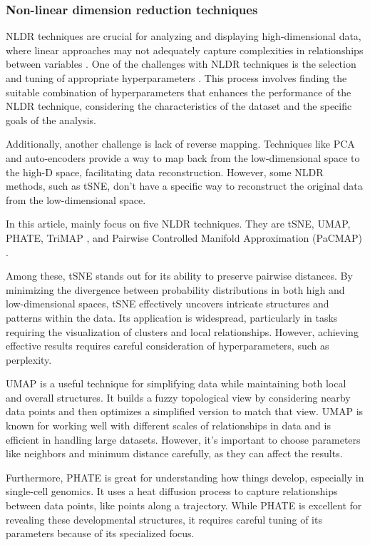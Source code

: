 \documentclass[
  12pt]{article}
\begin{document}
\subsubsection{Non-linear dimension reduction
techniques}\label{non-linear-dimension-reduction-techniques}

NLDR techniques are crucial for analyzing and displaying
high-dimensional data, where linear approaches may not adequately
capture complexities in relationships between variables
\citep{Johnstone2009}. One of the challenges with NLDR techniques is the
selection and tuning of appropriate hyperparameters \citep{liao2023}.
This process involves finding the suitable combination of
hyperparameters that enhances the performance of the NLDR technique,
considering the characteristics of the dataset and the specific goals of
the analysis.

Additionally, another challenge is lack of reverse mapping. Techniques
like PCA and auto-encoders \citep{article65} provide a way to map back
from the low-dimensional space to the high-D space, facilitating data
reconstruction. However, some NLDR methods, such as tSNE, don't have a
specific way to reconstruct the original data from the low-dimensional
space.

In this article, mainly focus on five NLDR techniques. They are tSNE,
UMAP, PHATE, TriMAP \citep{article02}, and Pairwise Controlled Manifold
Approximation (PaCMAP) \citep{Yingfan2021}.

Among these, tSNE \citep{Laurens2008} stands out for its ability to
preserve pairwise distances. By minimizing the divergence between
probability distributions in both high and low-dimensional spaces, tSNE
effectively uncovers intricate structures and patterns within the data.
Its application is widespread, particularly in tasks requiring the
visualization of clusters and local relationships. However, achieving
effective results requires careful consideration of hyperparameters,
such as perplexity.

UMAP \citep{Leland2018} is a useful technique for simplifying data while
maintaining both local and overall structures. It builds a fuzzy
topological view by considering nearby data points and then optimizes a
simplified version to match that view. UMAP is known for working well
with different scales of relationships in data and is efficient in
handling large datasets. However, it's important to choose parameters
like neighbors and minimum distance carefully, as they can affect the
results.

Furthermore, PHATE \citep{article03} is great for understanding how
things develop, especially in single-cell genomics. It uses a heat
diffusion process to capture relationships between data points, like
points along a trajectory. While PHATE is excellent for revealing these
developmental structures, it requires careful tuning of its parameters
because of its specialized focus.
\end{document}
